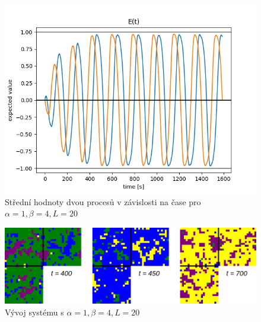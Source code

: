 \documentclass{article}
\begin{document}
\begin{figure}[H]
    \includegraphics[scale=0.8]{A1B4L20_graph}
    \caption{Střední hodnoty dvou procesů v závislosti na čase pro $\alpha = 1, \beta = 4, L = 20$}
\end{figure}
\begin{figure}[H]
    \includegraphics[scale=0.4]{A1B4L20_evolution}
    \caption{Vývoj systému s $\alpha = 1, \beta = 4, L = 20$}
\end{figure}
\end{document}
